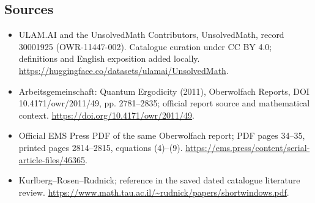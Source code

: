 \documentclass[11pt]{article}
\begin{document}
\subsection{Sources}
\begin{itemize}
\item[\hypertarget{source:30001925:1}{S1}] ULAM.AI and the UnsolvedMath Contributors, UnsolvedMath, record 30001925 (OWR-11447-002). Catalogue curation under CC BY 4.0; definitions and English exposition added locally.
\url{https://huggingface.co/datasets/ulamai/UnsolvedMath}.
\item[\hypertarget{source:30001925:2}{S2}] Arbeitsgemeinschaft: Quantum Ergodicity (2011), Oberwolfach Reports, DOI 10.4171/owr/2011/49, pp. 2781--2835; official report source and mathematical context.
\url{https://doi.org/10.4171/owr/2011/49}.
\item[\hypertarget{source:30001925:3}{S3}] Official EMS Press PDF of the same Oberwolfach report; PDF pages 34--35, printed pages 2814--2815, equations (4)--(9).
\url{https://ems.press/content/serial-article-files/46365}.
\item[\hypertarget{source:30001925:4}{S4}] Kurlberg--Rosen--Rudnick; reference in the saved dated catalogue literature review.
\url{https://www.math.tau.ac.il/~rudnick/papers/shortwindows.pdf}.
\end{itemize}
\label{end:30001925}
\end{document}
